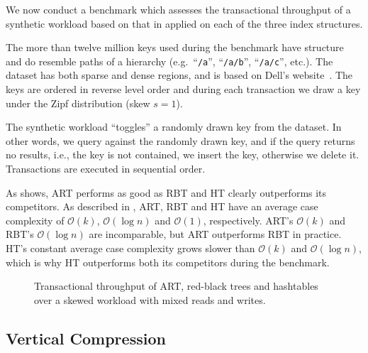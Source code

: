 \documentclass[abstracton,12pt]{scrartcl}
\theoremstyle{definition}
\begin{document}
We now conduct a benchmark which assesses the transactional throughput of 
a synthetic workload based on that in \cite{wellenzohn2017wapi} applied on 
each of the three index structures.

The more than twelve million keys used during the benchmark have structure
and do resemble paths of a hierarchy (e.g.\ ``\texttt{/a}'', ``\texttt{/a/b}'',
``\texttt{/a/c}'', etc.). The dataset has both sparse and dense regions, and
is based on Dell's website~\cite{wellenzohn2017wapi}. 
The keys are ordered in reverse level order and during each 
transaction we draw a key under the Zipf distribution (skew $s=1$).

The synthetic workload ``toggles'' a randomly drawn key from the dataset.
In other words, we query against the randomly drawn key, and if the query 
returns no results, i.e., the key is not contained, we insert the key, 
otherwise we delete it. Transactions are executed in sequential order.

As  shows, ART performs as good as RBT and HT clearly
outperforms its competitors. As described in , ART,
RBT and HT have an average case complexity of $\mathcal{O}(k)$, 
$\mathcal{O}(\log{}n)$ and $\mathcal{O}(1)$, respectively. ART's
$\mathcal{O}(k)$ and RBT's $\mathcal{O}(\log{}n)$ are incomparable, but
ART outperforms RBT in practice. HT's constant average case complexity grows
slower than $\mathcal{O}(k)$ and $\mathcal{O}(\log{}n)$, which is why HT
outperforms both its competitors during the benchmark.

\vspace{-9mm}

\begin{figure}[H]
  \centering
  \caption{Transactional throughput of ART,
    red-black trees and hashtables over a skewed workload with
    mixed reads and writes.}
  \label{fig:main-benchmark}
\end{figure}

\subsection{Vertical Compression}
\label{sec:compression-benchmark}
\end{document}
